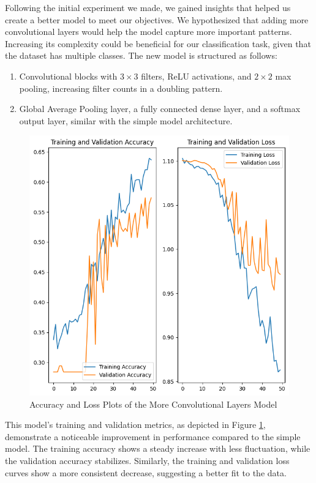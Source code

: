 Following the initial experiment we made, we gained insights that helped us create a better model to meet our objectives. We hypothesized that adding more convolutional layers would help the model capture more important patterns. Increasing its complexity could be beneficial for our classification task, given that the dataset has multiple classes. The new model is structured as follows:

\begin{enumerate}
  \item Convolutional blocks with \(3 \times 3\) filters, ReLU activations, and \(2 \times 2\) max pooling, increasing filter counts in a doubling pattern.
  \item Global Average Pooling layer, a fully connected dense layer, and a softmax output layer, similar with the simple model architecture.
\end{enumerate}

\begin{figure}[H]
  \includegraphics[width=\linewidth]{figures/many_layers.png}
  \caption{Accuracy and Loss Plots of the More Convolutional Layers Model}
  \label{fig:many_layers}
\end{figure}

This model's training and validation metrics, as depicted in Figure \ref{fig:many_layers}, demonstrate a noticeable improvement in performance compared to the simple model. The training accuracy shows a steady increase with less fluctuation, while the validation accuracy stabilizes. Similarly, the training and validation loss curves show a more consistent decrease, suggesting a better fit to the data.

